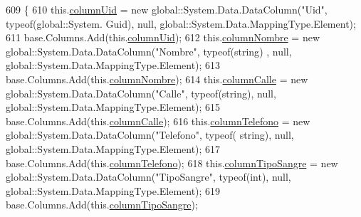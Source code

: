 \begin{DoxyCode}
609                                      \{
610                 this.\hyperlink{class_proyecto___integrador__3_1_1ds_usuarios_1_1_usuarios_data_table_aff1b3e43ca01857d574946308f13c6f5}{columnUid} = \textcolor{keyword}{new} global::System.Data.DataColumn(\textcolor{stringliteral}{"Uid"}, typeof(global::System.
      Guid), null, global::System.Data.MappingType.Element);
611                 base.Columns.Add(this.\hyperlink{class_proyecto___integrador__3_1_1ds_usuarios_1_1_usuarios_data_table_aff1b3e43ca01857d574946308f13c6f5}{columnUid});
612                 this.\hyperlink{class_proyecto___integrador__3_1_1ds_usuarios_1_1_usuarios_data_table_a8bc5ddc1090c271f2438c39ff832cf6c}{columnNombre} = \textcolor{keyword}{new} global::System.Data.DataColumn(\textcolor{stringliteral}{"Nombre"}, typeof(\textcolor{keywordtype}{string})
      , null, global::System.Data.MappingType.Element);
613                 base.Columns.Add(this.\hyperlink{class_proyecto___integrador__3_1_1ds_usuarios_1_1_usuarios_data_table_a8bc5ddc1090c271f2438c39ff832cf6c}{columnNombre});
614                 this.\hyperlink{class_proyecto___integrador__3_1_1ds_usuarios_1_1_usuarios_data_table_a84de0144da103ba5bc2a1c48e824d49d}{columnCalle} = \textcolor{keyword}{new} global::System.Data.DataColumn(\textcolor{stringliteral}{"Calle"}, typeof(\textcolor{keywordtype}{string}), 
      null, global::System.Data.MappingType.Element);
615                 base.Columns.Add(this.\hyperlink{class_proyecto___integrador__3_1_1ds_usuarios_1_1_usuarios_data_table_a84de0144da103ba5bc2a1c48e824d49d}{columnCalle});
616                 this.\hyperlink{class_proyecto___integrador__3_1_1ds_usuarios_1_1_usuarios_data_table_a419f31ea3bb10486566a669c0838855d}{columnTelefono} = \textcolor{keyword}{new} global::System.Data.DataColumn(\textcolor{stringliteral}{"Telefono"}, typeof(\textcolor{keywordtype}{
      string}), null, global::System.Data.MappingType.Element);
617                 base.Columns.Add(this.\hyperlink{class_proyecto___integrador__3_1_1ds_usuarios_1_1_usuarios_data_table_a419f31ea3bb10486566a669c0838855d}{columnTelefono});
618                 this.\hyperlink{class_proyecto___integrador__3_1_1ds_usuarios_1_1_usuarios_data_table_ad853158916e076be016cd52dc50504a7}{columnTipoSangre} = \textcolor{keyword}{new} global::System.Data.DataColumn(\textcolor{stringliteral}{"TipoSangre"}, 
      typeof(\textcolor{keywordtype}{int}), null, global::System.Data.MappingType.Element);
619                 base.Columns.Add(this.\hyperlink{class_proyecto___integrador__3_1_1ds_usuarios_1_1_usuarios_data_table_ad853158916e076be016cd52dc50504a7}{columnTipoSangre});

\end{DoxyCode}
